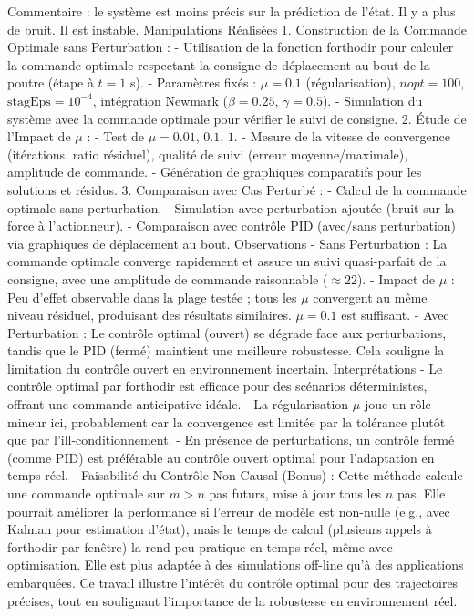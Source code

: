 \documentclass{rapportECL}
\begin{document}
Commentaire : le syst\`eme est moins pr\'ecis sur la pr\'ediction de l'\'etat. Il y a plus de bruit. Il est instable.
\newpage
Manipulations Réalisées
1. Construction de la Commande Optimale sans Perturbation :
   - Utilisation de la fonction forthodir pour calculer la commande optimale respectant la consigne de déplacement au bout de la poutre (étape à \(t = 1\) s).
   - Paramètres fixés : \(\mu = 0.1\) (régularisation), \(nopt = 100\), \(\text{stagEps} = 10^{-4}\), intégration Newmark (\(\beta = 0.25\), \(\gamma = 0.5\)).
   - Simulation du système avec la commande optimale pour vérifier le suivi de consigne.
2. Étude de l'Impact de \(\mu\) :
   - Test de \(\mu = 0.01\), \(0.1\), \(1\).
   - Mesure de la vitesse de convergence (itérations, ratio résiduel), qualité de suivi (erreur moyenne/maximale), amplitude de commande.
   - Génération de graphiques comparatifs pour les solutions et résidus.
3. Comparaison avec Cas Perturbé :
   - Calcul de la commande optimale sans perturbation.
   - Simulation avec perturbation ajoutée (bruit sur la force à l'actionneur).
   - Comparaison avec contrôle PID (avec/sans perturbation) via graphiques de déplacement au bout.
Observations
- Sans Perturbation : La commande optimale converge rapidement et assure un suivi quasi-parfait de la consigne, avec une amplitude de commande raisonnable (\(\approx 22\)).
- Impact de \(\mu\) : Peu d'effet observable dans la plage testée ; tous les \(\mu\) convergent au même niveau résiduel, produisant des résultats similaires. \(\mu = 0.1\) est suffisant.
- Avec Perturbation : Le contrôle optimal (ouvert) se dégrade face aux perturbations, tandis que le PID (fermé) maintient une meilleure robustesse. Cela souligne la limitation du contrôle ouvert en environnement incertain.
Interprétations
- Le contrôle optimal par forthodir est efficace pour des scénarios déterministes, offrant une commande anticipative idéale.
- La régularisation \(\mu\) joue un rôle mineur ici, probablement car la convergence est limitée par la tolérance plutôt que par l'ill-conditionnement.
- En présence de perturbations, un contrôle fermé (comme PID) est préférable au contrôle ouvert optimal pour l'adaptation en temps réel.
- Faisabilité du Contrôle Non-Causal (Bonus) : Cette méthode calcule une commande optimale sur \(m > n\) pas futurs, mise à jour tous les \(n\) pas. Elle pourrait améliorer la performance si l'erreur de modèle est non-nulle (e.g., avec Kalman pour estimation d'état), mais le temps de calcul (plusieurs appels à forthodir par fenêtre) la rend peu pratique en temps réel, même avec optimisation. Elle est plus adaptée à des simulations off-line qu'à des applications embarquées.
Ce travail illustre l'intérêt du contrôle optimal pour des trajectoires précises, tout en soulignant l'importance de la robustesse en environnement réel.
\end{document}
